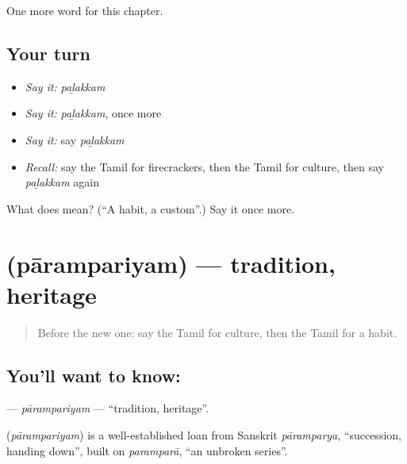 \begin{grammarlens}[title={What you've built}]
One more word for this chapter.
\end{grammarlens}

\subsection*{Your turn}
\begin{itemize}
\raggedright
  \item \emph{Say it:} \emph{paḻakkam}
  \item \emph{Say it:} \emph{paḻakkam}, once more
  \item \emph{Say it:} say \emph{paḻakkam}
  \item \emph{Recall:} say the Tamil for firecrackers, then the Tamil for culture, then say \emph{paḻakkam} again
\end{itemize}

\begin{tcolorbox}[breakable,colback=teal!4,colframe=teal!35!black,title={Before you move on}]
What does  mean? (\textquotedblleft{}A habit, a custom\textquotedblright{}.) Say it once more.
\end{tcolorbox}
\section[\texorpdfstring{\ta{பாரம்பரியம்} (pārampariyam)}{பாரம்பரியம் (pārampariyam)}]{ (pārampariyam) — tradition, heritage}

\label{lesson:TA-C246-parampariyam}



\begin{quote}
Before the new one: say the Tamil for culture, then the Tamil for a habit.
\end{quote}

\subsection*{You'll want to know: }
\textbf{} — \emph{pārampariyam} — \textquotedblleft{}tradition, heritage\textquotedblright{}.

\begin{cousinweb}
\textbf{} (\emph{pārampariyam}) is a well-established loan from Sanskrit \emph{pāramparya}, \textquotedblleft{}succession, handing down\textquotedblright{}, built on \emph{paramparā}, \textquotedblleft{}an unbroken series\textquotedblright{}.
\end{cousinweb}

